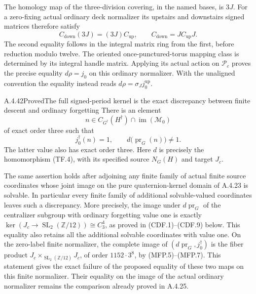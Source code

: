 The homology map of the three-division covering, in the named bases,
is $3J$.  For a zero-fixing actual ordinary deck normalizer its upstairs
and downstairs signed matrices therefore satisfy
\[
       C_{\mathrm{down}}(3J)=(3J)C_{\mathrm{up}},\qquad
       C_{\mathrm{down}}=JC_{\mathrm{up}}J.
                                                               \tag{MFP.4}
\]
The second equality follows in the integral matrix ring from the first,
before reduction modulo twelve.  The oriented once-punctured-torus
mapping class is determined by its integral handle matrix.  Applying
its actual action on $\mathcal P_c$ proves the precise equality
$d\rho=j_0$ on this ordinary normalizer.  With the unaligned convention
the equality instead reads $d\rho=\sigma_J j_0^{\mathrm{up}}$.


\begin{result}{A.4.42}{Proved}{The full signed-period kernel is the exact discrepancy between finite descent and ordinary forgetting}
There is an element
\[
 n\in C_{G^\dagger}(H^\dagger)
                     \cap\operatorname{im}(\mathcal M_0)
                                                               \tag{FCD.3}
\]
of exact order three such that
\[
       j_0^\dagger(n)=1,\qquad
       d\bigl(\operatorname{pr}_G(n)\bigr)\ne1.
                                                               \tag{FCD.4}
\]
The latter value also has exact order three.  Here $d$
is precisely the homomorphism (TF.4), with its specified
source $N_G(H)$ and target $J_c$.

The same assertion holds after adjoining any finite
family of actual finite source coordinates whose joint
image on the pure quaternion-kernel domain of A.4.23 is
solvable.  In particular every finite family of additional
solvable-valued coordinates leaves such a discrepancy.
More precisely, the image under $d\operatorname{pr}_G$ of the centralizer subgroup with ordinary forgetting value one is exactly
$\ker(J_c\to\operatorname{SL}_2(\mathbb Z/12))\cong C_3^4$, as proved in (CDF.1)--(CDF.9) below.
This equality also retains all the additional solvable coordinates with value one.
On the zero-label finite normalizer, the complete image of $(d\operatorname{pr}_G,j_0^\dagger)$ is the fiber product
$J_c\times_{\operatorname{SL}_2(\mathbb Z/12)}J_c$, of order $1152\cdot3^8$, by (MFP.5)--(MFP.7).
This statement gives the exact failure of the proposed
equality of these two maps on this finite normalizer.
Their equality on the image of the actual ordinary
normalizer remains the comparison already proved in
A.4.25.
\end{result}

